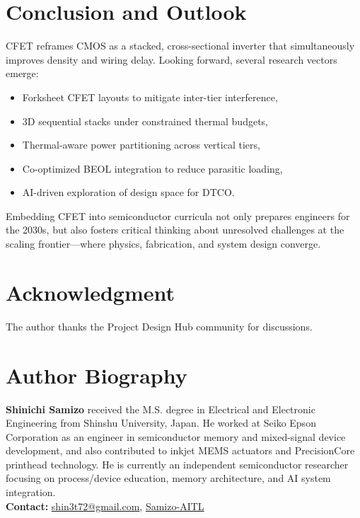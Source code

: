 \documentclass[conference]{IEEEtran}
\begin{document}
\section{Conclusion and Outlook}
CFET reframes CMOS as a stacked, cross-sectional inverter that simultaneously improves density and wiring delay.
Looking forward, several research vectors emerge:
\begin{itemize}
  \item Forksheet CFET layouts to mitigate inter-tier interference,
  \item 3D sequential stacks under constrained thermal budgets,
  \item Thermal-aware power partitioning across vertical tiers,
  \item Co-optimized BEOL integration to reduce parasitic loading,
  \item AI-driven exploration of design space for DTCO.
\end{itemize}
Embedding CFET into semiconductor curricula not only prepares engineers for the 2030s,
but also fosters critical thinking about unresolved challenges at the scaling frontier—where physics, fabrication, and system design converge.

\section*{Acknowledgment}
The author thanks the Project Design Hub community for discussions.




\section*{Author Biography}
\noindent\textbf{Shinichi Samizo}
received the M.S. degree in Electrical and Electronic Engineering from Shinshu University, Japan.
He worked at Seiko Epson Corporation as an engineer in semiconductor memory and mixed-signal device development, and also contributed to inkjet MEMS actuators and PrecisionCore printhead technology.
He is currently an independent semiconductor researcher focusing on process/device education, memory architecture, and AI system integration.\\[2pt]
\textbf{Contact:} \href{mailto:shin3t72@gmail.com}{shin3t72@gmail.com}, \href{https://github.com/Samizo-AITL}{Samizo-AITL}
\end{document}

